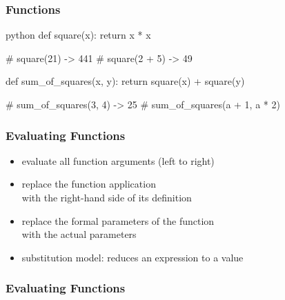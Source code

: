 \documentclass[dvipsnames]{beamer}
\theoremstyle{plain}
\begin{document}
\begin{frame}[fragile]
  \frametitle{Functions}

  \begin{example}[Python]
    \begin{pygments}{python}
def square(x):
    return x * x

# square(21) -> 441
# square(2 + 5) -> 49

def sum_of_squares(x, y):
    return square(x) + square(y)

# sum_of_squares(3, 4) -> 25
# sum_of_squares(a + 1, a * 2)
    \end{pygments}
  \end{example}
\end{frame}

\begin{frame}
  \frametitle{Evaluating Functions}

  \begin{itemize}
    \item evaluate all function arguments (left to right)
    \item replace the function application\\
      with the right-hand side of its definition
    \item replace the formal parameters of the function\\
      with the actual parameters

    \pause
    \bigskip
    \item \alert{substitution model}: reduces an expression to a value
  \end{itemize}
\end{frame}

\begin{frame}[fragile]
  \frametitle{Evaluating Functions}

  \begin{example}

    \pause
    \medskip

    \pause
    \medskip

    \pause
    \medskip

    \pause
    \medskip

    \pause
    \medskip

    \pause
    \medskip

    \pause
    \medskip
  \end{example}
\end{frame}
\end{document}
